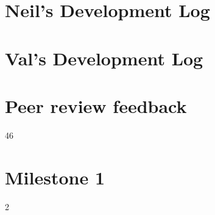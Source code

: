 \documentclass[11pt,a4paper,titlepage]{report}
\begin{document}
\begin{appendices}
\chapter{Neil's Development Log}


\chapter{Val's Development Log}



\chapter{Peer review feedback}
\newpage
\addtocounter {page} {46}

\chapter{Milestone 1}
\newpage
\addtocounter {page} {2}


\end{appendices}

\nocite{*}
\printbibliography[heading=bibintoc]
\end{document}
